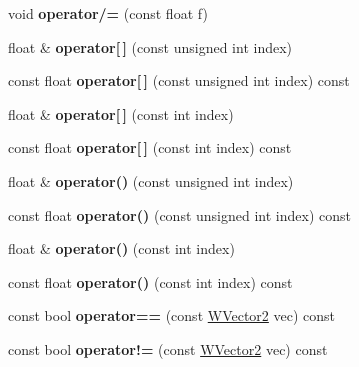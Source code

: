 \begin{DoxyCompactItemize}
\item 
void {\bfseries operator/=} (const float f)\hypertarget{class_w_vector2_aba80d7f25c76fc930d8ca4e85c652999}{}\label{class_w_vector2_aba80d7f25c76fc930d8ca4e85c652999}

\item 
float \& {\bfseries operator\mbox{[}$\,$\mbox{]}} (const unsigned int index)\hypertarget{class_w_vector2_aa08b3dc73a709f97e3e62fb1f3881ae5}{}\label{class_w_vector2_aa08b3dc73a709f97e3e62fb1f3881ae5}

\item 
const float {\bfseries operator\mbox{[}$\,$\mbox{]}} (const unsigned int index) const \hypertarget{class_w_vector2_a6cc5814ef4a9e3669f7ec7b3b0c1d349}{}\label{class_w_vector2_a6cc5814ef4a9e3669f7ec7b3b0c1d349}

\item 
float \& {\bfseries operator\mbox{[}$\,$\mbox{]}} (const int index)\hypertarget{class_w_vector2_a61e867cdb596b721a24a9b362a2426f8}{}\label{class_w_vector2_a61e867cdb596b721a24a9b362a2426f8}

\item 
const float {\bfseries operator\mbox{[}$\,$\mbox{]}} (const int index) const \hypertarget{class_w_vector2_af69a3bdd921622ec7426a9549f100526}{}\label{class_w_vector2_af69a3bdd921622ec7426a9549f100526}

\item 
float \& {\bfseries operator()} (const unsigned int index)\hypertarget{class_w_vector2_ac027db3c00c254ae7ac4e1f566328842}{}\label{class_w_vector2_ac027db3c00c254ae7ac4e1f566328842}

\item 
const float {\bfseries operator()} (const unsigned int index) const \hypertarget{class_w_vector2_a07ab1f45d1389effe62d312b30d45ba0}{}\label{class_w_vector2_a07ab1f45d1389effe62d312b30d45ba0}

\item 
float \& {\bfseries operator()} (const int index)\hypertarget{class_w_vector2_a32a6ba310fe076e168047fbdd3dce980}{}\label{class_w_vector2_a32a6ba310fe076e168047fbdd3dce980}

\item 
const float {\bfseries operator()} (const int index) const \hypertarget{class_w_vector2_a08e5d39df18a00d00a38bd34a01e7254}{}\label{class_w_vector2_a08e5d39df18a00d00a38bd34a01e7254}

\item 
const bool {\bfseries operator==} (const \hyperlink{class_w_vector2}{W\+Vector2} vec) const \hypertarget{class_w_vector2_a1e3cab00daced4ad4e47a5cf3bdc23f6}{}\label{class_w_vector2_a1e3cab00daced4ad4e47a5cf3bdc23f6}

\item 
const bool {\bfseries operator!=} (const \hyperlink{class_w_vector2}{W\+Vector2} vec) const \hypertarget{class_w_vector2_a18f369b09e1800f1e3650f1c9a421c9a}{}\label{class_w_vector2_a18f369b09e1800f1e3650f1c9a421c9a}

\end{DoxyCompactItemize}
